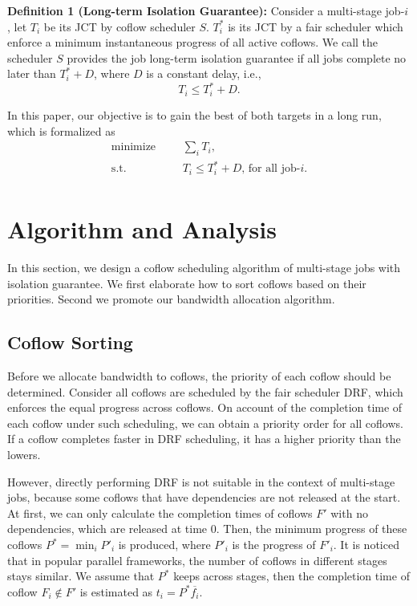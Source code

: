 \documentclass[10pt, conference, letterpaper]{IEEEtran}
\begin{document}
\textbf{Definition 1 (Long-term Isolation Guarantee):} Consider a multi-stage job-$i$, let $T_i$ be its JCT by coflow scheduler $S$. $T_i^*$ is its JCT by a fair scheduler which enforce a minimum instantaneous progress of all active coflows. We call the scheduler $S$ provides the job long-term isolation guarantee if all jobs complete no later than $T_i^* + D$, where $D$ is a constant delay, i.e.,
\begin{equation}
	T_i \leq T_i^* + D.
\end{equation}

In this paper, our objective is to gain the best of both targets in a long run, which is formalized as
\begin{equation}
	\begin{aligned}
		\text{minimize} & & &\sum\limits_{i}T_i,\\
		\text{s.t.} & & &T_i \leq T_i^* + D \text{, for all job-}i.\\
	\end{aligned}
\end{equation}

\section{Algorithm and Analysis}\label{algorithm}
In this section, we design a coflow scheduling algorithm of multi-stage jobs with isolation guarantee. We first elaborate how to sort coflows based on their priorities. Second we promote our bandwidth allocation algorithm.

\subsection{Coflow Sorting}
Before we allocate bandwidth to coflows, the priority of each coflow should be determined. Consider all coflows are scheduled by the fair scheduler DRF, which enforces the equal progress across coflows\cite{DRF,HUG}. On account of the completion time of each coflow under such scheduling, we can obtain a priority order for all coflows. If a coflow completes faster in DRF scheduling, it has a higher priority than the lowers.

However, directly performing DRF is not suitable in the context of multi-stage jobs, because some coflows that have dependencies are not released at the start. At first, we can only calculate the completion times of coflows $F'$ with no dependencies, which are released at time 0. Then, the minimum progress of these coflows $P^* = \min_iP'_i$ is produced, where $P'_i$ is the progress of $F'_i$. It is noticed that in popular parallel frameworks, the number of coflows in different stages stays similar\cite{Spark,coflowsurvey}. We assume that $P^*$ keeps across stages, then the completion time of coflow $F_i \notin F'$ is estimated as $t_i = P^*\overline{f_i}$.
\end{document}
